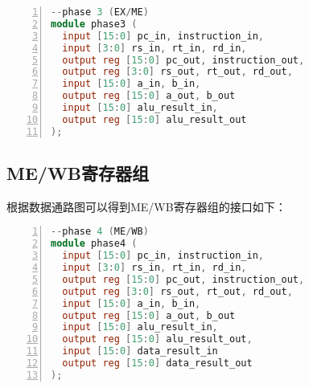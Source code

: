 \begin{lstlisting}[language=verilog,frame=single,breaklines,breaklines,basicstyle=\footnotesize\ttfamily,numbers=left]
--phase 3 (EX/ME)
module phase3 (
  input [15:0] pc_in, instruction_in,
  input [3:0] rs_in, rt_in, rd_in,
  output reg [15:0] pc_out, instruction_out,
  output reg [3:0] rs_out, rt_out, rd_out,
  input [15:0] a_in, b_in,
  output reg [15:0] a_out, b_out
  input [15:0] alu_result_in,
  output reg [15:0] alu_result_out
);
\end{lstlisting}

\subsection{ME/WB寄存器组}
根据数据通路图可以得到ME/WB寄存器组的接口如下：

\begin{lstlisting}[language=verilog,frame=single,breaklines,breaklines,basicstyle=\footnotesize\ttfamily,numbers=left]
--phase 4 (ME/WB)
module phase4 (
  input [15:0] pc_in, instruction_in,
  input [3:0] rs_in, rt_in, rd_in,
  output reg [15:0] pc_out, instruction_out,
  output reg [3:0] rs_out, rt_out, rd_out,
  input [15:0] a_in, b_in,
  output reg [15:0] a_out, b_out
  input [15:0] alu_result_in,
  output reg [15:0] alu_result_out,
  input [15:0] data_result_in
  output reg [15:0] data_result_out
);
\end{lstlisting}

